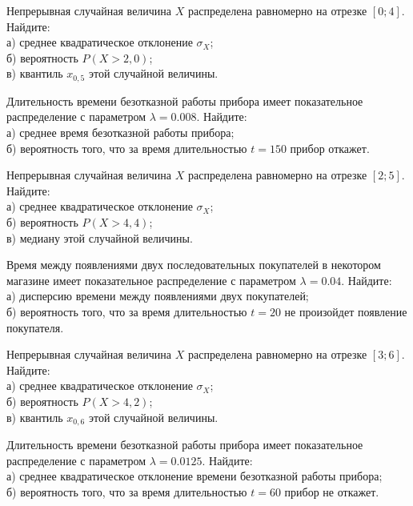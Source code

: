 \vfill

\newpage\setcounter{zad}{0}

\z Непрерывная случайная величина $X$ распределена равномерно на отрезке $[0; 4]$. Найдите: \\ \quad а) среднее квадратическое отклонение $\sigma_X$; \\ \quad б) вероятность $P(X>2{,}0)$; \\ \quad в) квантиль $x_{0{,}5}$ этой случайной величины.


\vfill

\z Длительность времени безотказной работы прибора имеет показательное распределение с параметром $\lambda = 0.008$. Найдите: \\ \quad а) среднее время безотказной работы прибора; \\ \quad б) вероятность того, что за время длительностью $t = 150$ прибор  откажет.
 

\vfill

\newpage\setcounter{zad}{0}

\z Непрерывная случайная величина $X$ распределена равномерно на отрезке $[2; 5]$. Найдите: \\ \quad а) среднее квадратическое отклонение $\sigma_X$; \\ \quad б) вероятность $P(X>4{,}4)$; \\ \quad в) медиану этой случайной величины.


\vfill

\z Время между появлениями двух последовательных покупателей в некотором магазине имеет показательное распределение с параметром $\lambda = 0.04$. Найдите: \\ \quad а) дисперсию времени между появлениями двух покупателей; \\ \quad б) вероятность того, что за время длительностью $t = 20$ не произойдет появление покупателя.
 

\vfill

\newpage\setcounter{zad}{0}

\z Непрерывная случайная величина $X$ распределена равномерно на отрезке $[3; 6]$. Найдите: \\ \quad а) среднее квадратическое отклонение $\sigma_X$; \\ \quad б) вероятность $P(X>4{,}2)$; \\ \quad в) квантиль $x_{0{,}6}$ этой случайной величины.


\vfill

\z Длительность времени безотказной работы прибора имеет показательное распределение с параметром $\lambda = 0.0125$. Найдите: \\ \quad а) среднее квадратическое отклонение времени безотказной работы прибора; \\ \quad б) вероятность того, что за время длительностью $t = 60$ прибор не откажет.
 

